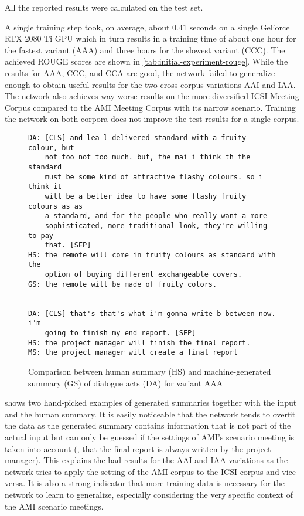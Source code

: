 All the reported results were calculated on the test set.

A single training step took, on average, about $0.41$ seconds on a single GeForce RTX 2080 Ti GPU which in turn results in a training time of about one hour for the fastest variant (AAA) and three hours for the slowest variant (CCC).
The achieved ROUGE scores are shown in \cref{tab:initial-experiment-rouge}.
While the results for AAA, CCC, and CCA are good, the network failed to generalize enough to obtain useful results for the two cross-corpus variations AAI and IAA.
The network also achieves way worse results on the more diversified ICSI Meeting Corpus compared to the AMI Meeting Corpus with its narrow scenario.
Training the network on both corpora does not improve the test results for a single corpus.

\begin{figure}[h]
\begin{lstlisting}[numbers=none]
DA: [CLS] and lea l delivered standard with a fruity colour, but
    not too not too much. but, the mai i think th the standard
    must be some kind of attractive flashy colours. so i think it
    will be a better idea to have some flashy fruity colours as as
    a standard, and for the people who really want a more
    sophisticated, more traditional look, they're willing to pay
    that. [SEP]
HS: the remote will come in fruity colours as standard with the
    option of buying different exchangeable covers.
GS: the remote will be made of fruity colors.
------------------------------------------------------------------
DA: [CLS] that's that's what i'm gonna write b between now. i'm
    going to finish my end report. [SEP]
HS: the project manager will finish the final report.
MS: the project manager will create a final report
\end{lstlisting}
\caption{Comparison between human summary (HS) and machine-generated summary (GS) of dialogue acts (DA) for variant AAA}
\label{fig:initial-experiment-example}
\end{figure}

 shows two hand-picked examples of generated summaries together with the input and the human summary.
It is easily noticeable that the network tends to overfit the data as the generated summary contains information that is not part of the actual input but can only be guessed if the settings of AMI's scenario meeting is taken into account (\eg, that the final report is always written by the project manager).
This explains the bad results for the AAI and IAA variations as the network tries to apply the setting of the AMI corpus to the ICSI corpus and vice versa.
It is also a strong indicator that more training data is necessary for the network to learn to generalize, especially considering the very specific context of the AMI scenario meetings.


